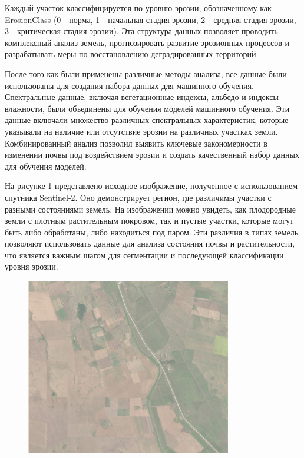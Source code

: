 Каждый участок классифицируется по уровню эрозии, обозначенному как
ErosionClass (0 - норма, 1 - начальная стадия эрозии, 2 - средняя стадия
эрозии, 3 - критическая стадия эрозии). Эта структура данных позволяет
проводить комплексный анализ земель, прогнозировать развитие эрозионных
процессов и разрабатывать меры по восстановлению деградированных
территорий.

После того как были применены различные методы анализа, все данные были
использованы для создания набора данных для машинного обучения.
Спектральные данные, включая вегетационные индексы, альбедо и индексы
влажности, были объединены для обучения моделей машинного обучения. Эти
данные включали множество различных спектральных характеристик, которые
указывали на наличие или отсутствие эрозии на различных участках земли.
Комбинированный анализ позволил выявить ключевые закономерности в
изменении почвы под воздействием эрозии и создать качественный набор
данных для обучения моделей.

На рисунке 1 представлено исходное изображение, полученное с
использованием спутника Sentinel-2. Оно демонстрирует регион, где
различимы участки с разными состояниями земель. На изображении можно
увидеть, как плодородные земли с плотным растительным покровом, так и
пустые участки, которые могут быть либо обработаны, либо находиться под
паром. Эти различия в типах земель позволяют использовать данные для
анализа состояния почвы и растительности, что является важным шагом для
сегментации и последующей классификации уровня эрозии.


\begin{figure}[H]
	\centering
	\includegraphics[width=0.8\textwidth]{media/ict/image31}
	\caption*{}
\end{figure}


